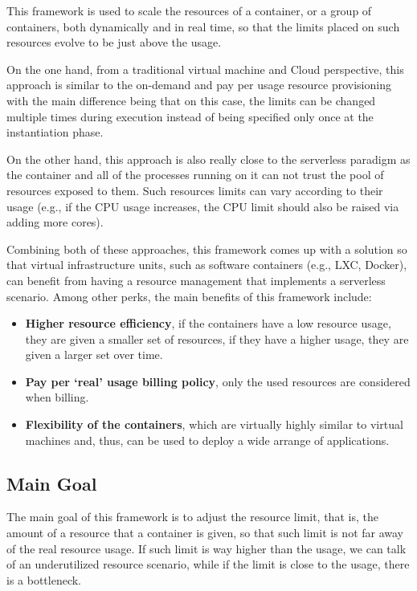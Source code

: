 \documentclass[12pt]{article}
\begin{document}
This framework is used to scale the resources of a container, or a group of containers, both dynamically and in real time, so that the limits placed on such resources evolve to be just above the usage.

On the one hand, from a traditional virtual machine and Cloud perspective, this approach is similar to the on-demand and pay per usage resource provisioning with the main difference being that on this case, the limits can be changed multiple times during execution instead of being specified only once at the instantiation phase.

On the other hand, this approach is also really close to the serverless paradigm as the container and all of the processes running on it can not trust the pool of resources exposed to them. Such resources limits can vary according to their usage (e.g., if the CPU usage increases, the CPU limit should also be raised via adding more cores).

Combining both of these approaches, this framework comes up with a solution so that virtual infrastructure units, such as software containers (e.g., LXC, Docker), can benefit from having a resource management that implements a serverless scenario. Among other perks, the main benefits of this framework include:
\begin{itemize}
	\item \textbf{Higher resource efficiency}, if the containers have a low resource usage, they are given a smaller set of resources, if they have a higher usage, they are given a larger set over time.
	
	\item \textbf{Pay per `real' usage billing policy}, only the used resources are considered when billing.
	
	\item \textbf{Flexibility of the containers}, which are virtually highly similar to virtual machines and, thus, can be used to deploy a wide arrange of applications.
\end{itemize}


\subsection{Main Goal}

The main goal of this framework is to adjust the resource limit, that is, the amount of a resource that a container is given, so that such limit is not far away of the real resource usage. If such limit is way higher than the usage, we can talk of an underutilized resource scenario, while if the limit is close to the usage, there is a bottleneck.
\end{document}
